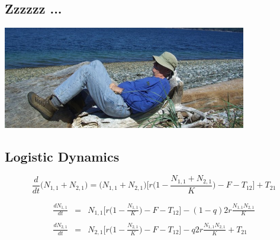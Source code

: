\documentclass[a4paper,KOMA,landscape,titlepage]{powersem}
\newcommand\None{{N_{1,1}}}
\newcommand\Ntwo{{N_{2,1}}}
\newcommand\Nsum{{N_{1,1}+N_{2,1}}}
\begin{document}
\begin{slide}\section{Zzzzzz ... }
\begin{center}
\includegraphics[width=0.8\textwidth]{./graphics/recumbant.png}
\end{center}
\end{slide}


\begin{slide}\section{Logistic Dynamics}
\begin{center}
\begin{equation}
\frac{d}{dt}\big(\Nsum\big)=\big(\Nsum\big)\Big[r\Big(1-\frac{\Nsum}{K}\Big)-F-T_{12}\Big]+T_{21}
\label{eqn:logistic}
\end{equation}
\vspace{2ex}

\begin{eqnarray}
\label{eqn:coupledschaeferq}
\frac{d\None}{dt}&=&\None\Big[r\Big(1-\frac{\None}{K}\Big)
-F - T_{12}\Big] - (1-q)2r\frac{\None\Ntwo}{K}\nonumber\\
\\
\frac{d\Ntwo}{dt}&=&\Ntwo\Big[r\Big(1-\frac{\Ntwo}{K}\Big)
-F - T_{12}\Big] - q2r\frac{\None\Ntwo}{K} + T_{21}\nonumber
\end{eqnarray}
\end{center}
\end{slide}
\end{document}
